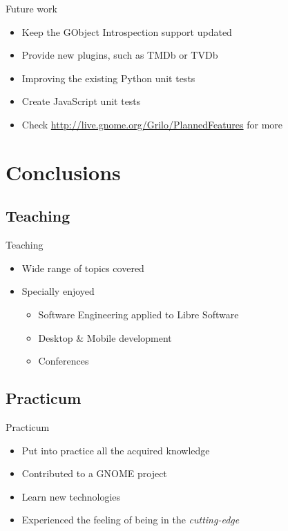 \documentclass{beamer}
\begin{document}
\begin{frame}{Future work}
\begin{itemize}
  \item Keep the GObject Introspection support updated
  \item Provide new plugins, such as TMDb or TVDb
  \item Improving the existing Python unit tests
  \item Create JavaScript unit tests
  \item Check \url{http://live.gnome.org/Grilo/PlannedFeatures} for more
\end{itemize}
\end{frame}

\section{Conclusions}

\subsection*{Teaching}

\begin{frame}{Teaching}
\begin{itemize}
  \item Wide range of topics covered
  \item Specially enjoyed
  \begin{itemize}
    \item Software Engineering applied to Libre Software
    \item Desktop \& Mobile development
    \item Conferences
  \end{itemize}
\end{itemize}
\end{frame}

\subsection*{Practicum}

\begin{frame}{Practicum}
\begin{itemize}
  \item Put into practice all the acquired knowledge
  \item Contributed to a GNOME project
  \item Learn new technologies
  \item Experienced the feeling of being in the {\it cutting-edge}
\end{itemize}
\end{frame}
\end{document}
